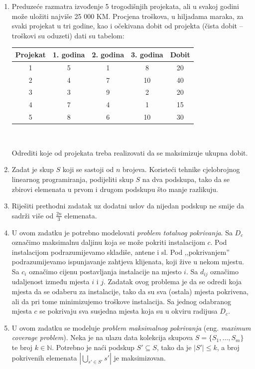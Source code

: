 \documentclass[b5paper, utf8, 11pt, colorlinks]{book}
\theoremstyle{definition}
\begin{document}
\begin{enumerate}
	
	\item Preduzeće  razmatra izvođenje 5 trogodišnjih projekata, ali u svakoj godini može uložiti najviše
	25 000 KM. Procjena troškova, u hiljadama maraka, za svaki projekat u tri godine, kao i
	očekivana dobit od projekta (čista dobit – troškovi su oduzeti)  dati su tabelom:
		\begin{center}
			
			\begin{tabular}{|c|c|c|c|c|}
				\hline
				Projekat & 1. godina & 2. godina & 3. godina & Dobit \\
				\hline
				1 & 5 & 1 & 8 & 20 \\
				\hline
				2 & 4 & 7 & 10 & 40 \\
				\hline
				3 & 3 & 9 & 2 & 20 \\
				\hline
				4 & 7 & 4 & 1 & 15 \\
				\hline
				5 & 8 & 6 & 10 & 30 \\
				\hline
			\end{tabular}  \\
		\end{center}
	Odrediti koje od projekata treba realizovati da se maksimizuje ukupna dobit.
	
	\item Zadat je skup $S$ koji se sastoji od $n$ brojeva. Koristeći tehnike cjelobrojnog linearnog programiranja, podijeliti skup $S$ na dva podskupa, tako da se zbirovi elemenata u prvom i drugom podskupu što manje razlikuju.
	
	\item Riješiti prethodni zadatak uz dodatni uslov da nijedan podskup ne smije da sadrži više od $\frac {2n}3$ elemenata.
	
	
	
	\item U ovom zadatku je potrebno modelovati \emph{problem totalnog pokrivanja}. %
	Sa $D_c$ označimo maksimalnu daljinu koja se može pokriti instalacijom $c$. Pod instalacijom podrazumijevamo skladiše, antene i sl. Pod ,,pokrivanjem'' podrazumijevamo ispunjavanje zahtjeva klijenata, koji žive u nekom mjestu. Sa $c_i$ označimo cijenu postavljanja instalacije na mjesto $i$. Sa $d_{ij}$ označimo udaljenost između mjesta $i$ i $j$. Zadatak ovog problema je da se odredi koja mjesta da se odaberu za instalacije, tako da su sva (ostala) mjesta pokrivena, ali da pri tome minimizujemo troškove instalacija. Sa jednog odabranog mjesta $c$ se pokrivaju sva susjedna mjesta koja su u okviru radijusa $D_c$.  
	\item U ovom zadatku se modeluje  \emph{problem maksimalnog pokrivanja} (eng. \emph{maximum coverage problem}). Neka je na ulazu data kolekcija skupova  $S=\{ S_1, \ldots, S_m\}$ te broj $k \in \mathbb{N}$. Potrebno je naći podskup $S' \subseteq S$, tako da je $|S'|\leq k$, a broj pokrivenih elemenata $|\bigcup_{s' \in S'} s'|$ je maksimizovan. 
	

\end{enumerate}
\end{document}
